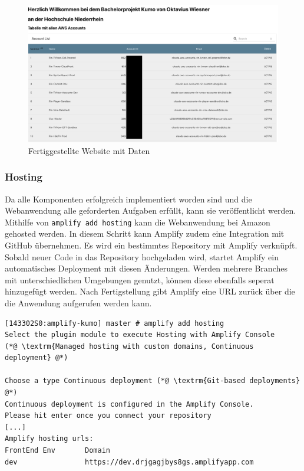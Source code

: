  \begin{figure}[htbp]
    \centering
    \includegraphics[width=1.0\textwidth]{50-Implementierung/Webanwendung.png}
    \caption{Fertiggestellte Website mit Daten}
    \label{fig:FertigSeite}
\end{figure}

\subsubsection{Hosting}

Da alle Komponenten erfolgreich implementiert worden sind und die Webanwendung alle geforderten Aufgaben erfüllt, kann sie veröffentlicht werden.
Mithilfe von \verb+amplify add hosting+ kann die Webanwendung bei Amazon gehosted werden.
In diesem Schritt kann Amplify zudem eine Integration mit GitHub übernehmen.
Es wird ein bestimmtes Repository mit Amplify verknüpft.
Sobald neuer Code in das Repository hochgeladen wird, startet Amplify ein automatisches Deployment mit diesen Änderungen.
Werden mehrere Branches mit unterschiedlichen Umgebungen genutzt, können diese ebenfalls seperat hinzugefügt werden.
Nach Fertigstellung gibt Amplify eine URL zurück über die die Anwendung aufgerufen werden kann.
\\
\begin{lstlisting}[basicstyle=\ttfamily\small, breaklines=true , frame = single, backgroundcolor=\color{flashwhite} ]
[143302S0:amplify-kumo] master # amplify add hosting
Select the plugin module to execute Hosting with Amplify Console
(*@ \textrm{Managed hosting with custom domains, Continuous deployment} @*)

Choose a type Continuous deployment (*@ \textrm{Git-based deployments} @*)
Continuous deployment is configured in the Amplify Console.
Please hit enter once you connect your repository
[...]
Amplify hosting urls:
FrontEnd Env       Domain
dev                https://dev.drjgagjbys8gs.amplifyapp.com

    \end{lstlisting}

